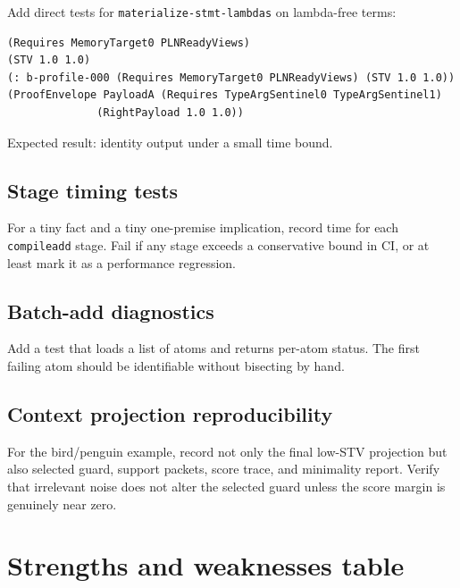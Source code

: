\documentclass[11pt]{article}
\newcommand{\code}[1]{\texttt{#1}}
\begin{document}
Add direct tests for \code{materialize-stmt-lambdas} on lambda-free terms:
\begin{verbatim}
(Requires MemoryTarget0 PLNReadyViews)
(STV 1.0 1.0)
(: b-profile-000 (Requires MemoryTarget0 PLNReadyViews) (STV 1.0 1.0))
(ProofEnvelope PayloadA (Requires TypeArgSentinel0 TypeArgSentinel1)
              (RightPayload 1.0 1.0))
\end{verbatim}

Expected result: identity output under a small time bound.

\subsection{Stage timing tests}

For a tiny fact and a tiny one-premise implication, record time for each
\code{compileadd} stage.  Fail if any stage exceeds a conservative bound in CI,
or at least mark it as a performance regression.

\subsection{Batch-add diagnostics}

Add a test that loads a list of atoms and returns per-atom status.  The first
failing atom should be identifiable without bisecting by hand.

\subsection{Context projection reproducibility}

For the bird/penguin example, record not only the final low-STV projection but
also selected guard, support packets, score trace, and minimality report.  Verify
that irrelevant noise does not alter the selected guard unless the score margin
is genuinely near zero.

\section{Strengths and weaknesses table}
\end{document}
